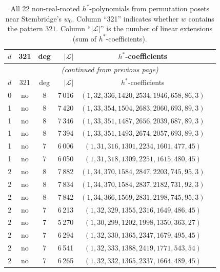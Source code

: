 \documentclass[11pt,reqno]{amsart}
\theoremstyle{definition}
\begin{document}
{%
\small
\setlength{\LTcapwidth}{\textwidth}
\begin{longtable}{rccrcl}
\caption{All 22 non-real-rooted $h^*$-polynomials from permutation
  posets near Stembridge's $w_0$.
  Column ``321'' indicates whether $w$ contains the pattern $321$.
  Column ``$|\mathcal{L}|$'' is the number of linear extensions (sum of $h^*$-coefficients).
}\label{tab:allnonRR}\\
\toprule
$d$ & 321 & deg & $|\mathcal{L}|$ & $h^*$-coefficients \\
\midrule
\endfirsthead
\multicolumn{6}{c}{\small\itshape (continued from previous page)}\\
\toprule
$d$ & 321 & deg & $|\mathcal{L}|$ & $h^*$-coefficients \\
\midrule
\endhead
\bottomrule
\endlastfoot

0 & no & 8 & 7\,016 & $(1,32,336,1420,2534,1946,658,86,3)$ \\
\midrule

1 & no & 8 & 7\,420 & $(1,33,354,1504,2683,2060,693,89,3)$ \\
1 & no & 8 & 7\,346 & $(1,33,351,1487,2656,2039,687,89,3)$ \\
1 & no & 8 & 7\,394 & $(1,33,351,1493,2674,2057,693,89,3)$ \\

1 & no & 7 & 6\,006 & $(1,31,316,1301,2234,1601,477,45)$ \\
1 & no & 7 & 6\,050 & $(1,31,318,1309,2251,1615,480,45)$ \\

\midrule

2 & no & 8 & 7\,882 & $(1,34,370,1584,2847,2203,745,95,3)$ \\
2 & no & 8 & 7\,834 & $(1,34,370,1584,2837,2182,731,92,3)$ \\
2 & no & 8 & 7\,842 & $(1,34,366,1569,2831,2198,745,95,3)$ \\

2 & no & 7 & 6\,213 & $(1,32,329,1355,2316,1649,486,45)$ \\
2 & no & 7 & 5\,270 & $(1,30,299,1202,1998,1350,363,27)$ \\
2 & no & 7 & 6\,294 & $(1,32,330,1365,2347,1679,495,45)$ \\
2 & no & 7 & 6\,541 & $(1,32,333,1388,2419,1771,543,54)$ \\
2 & no & 7 & 6\,265 & $(1,32,332,1365,2337,1664,489,45)$ \\


\end{longtable}}
\end{document}
